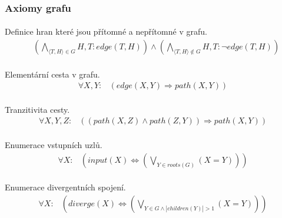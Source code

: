 \documentclass[a4paper,journal]{IEEEtran}
\begin{document}
\subsubsection{Axiomy grafu}
\paragraph*{}{Definice hran které jsou přítomné a nepřítomné v grafu.}
\begin{equation}
\begin{split} &
\left(\bigwedge_{\langle T,H\rangle \in G}{H,T}: edge\left(T,H\right)\right) \wedge 
\left(\bigwedge_{\langle T,H\rangle \not \in G}{H,T}: \neg edge\left(T,H\right)\right)
\end{split}
\end{equation}
\paragraph*{}{Elementární cesta v grafu.}
\begin{equation}
\begin{split}
\forall X,Y:&\left( edge\left(X,Y\right) \Rightarrow path\left(X,Y\right) \right)
\end{split}
\end{equation}
\paragraph*{}{Tranzitivita cesty.}
\begin{equation}
\begin{split}
\forall X,Y,Z:&\left(\left( path\left(X,Z\right) \wedge path\left(Z,Y\right) \right) \Rightarrow path\left(X,Y\right) \right)
\end{split}
\end{equation}
\paragraph*{}{Enumerace vstupních uzlů.}
\begin{equation}
\begin{split}
\forall X:&\left(input\left(X\right) \Leftrightarrow \left(\bigvee_{Y \in roots\left(G\right) }{\left(X=Y\right)} \right)\right)
\end{split}
\end{equation}
\paragraph*{}{Enumerace divergentních spojení.}
\begin{equation}
\begin{split}
\forall X:&\left(diverge\left(X\right) \Leftrightarrow \left(\bigvee_{
Y \in G \wedge\left| children(Y) \right| > 1 
}{(X=Y)} \right)\right)
\end{split}
\end{equation}
\end{document}
